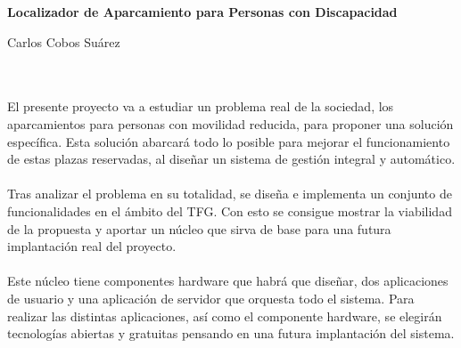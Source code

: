 \begin{center}
	{\large\bfseries Localizador de Aparcamiento para Personas con Discapacidad}\\
\end{center}
\begin{center}
	Carlos Cobos Suárez\\
\end{center}

\vspace{0.7cm}
\\

\vspace{0.7cm}
\\

El presente proyecto va a estudiar un problema real de la sociedad, los aparcamientos para personas con movilidad reducida, para proponer una solución específica. Esta solución abarcará todo lo posible para mejorar el funcionamiento de estas plazas reservadas, al diseñar un sistema de gestión integral y automático.
\\\\
Tras analizar el problema en su totalidad, se diseña e implementa un conjunto de funcionalidades en el ámbito del TFG. Con esto se consigue mostrar la viabilidad de la propuesta y aportar un núcleo que sirva de base para una futura implantación real del proyecto.
\\\\
Este núcleo tiene componentes hardware que habrá que diseñar, dos aplicaciones de usuario y una aplicación de servidor que orquesta todo el sistema. Para realizar las distintas aplicaciones, así como el componente hardware, se elegirán tecnologías abiertas y gratuitas pensando en una futura implantación del sistema.

